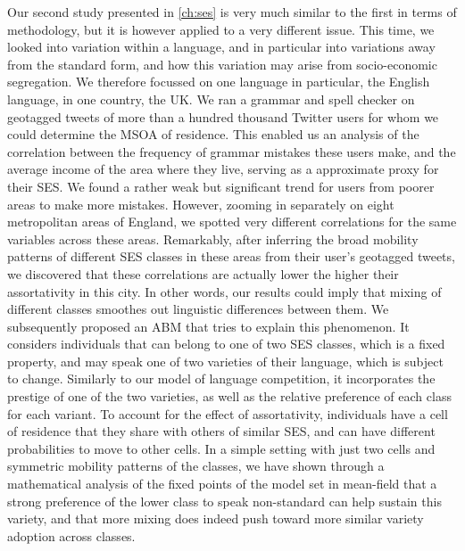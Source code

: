 \documentclass[../thesis.tex]{subfiles}
\begin{document}
Our second study presented in \cref{ch:ses} is very much similar to the first in terms
of methodology, but it is however applied to a very different issue. This time, we
looked into variation within a language, and in particular into variations away from the
standard form, and how this variation may arise from socio-economic segregation. We
therefore focussed on one language in particular, the English language, in one country,
the UK. We ran a grammar and spell checker on geotagged tweets of more than a hundred
thousand Twitter users for whom we could determine the \ac{MSOA} of residence. This
enabled us an analysis of the correlation between the frequency of grammar mistakes
these users make, and the average income of the area where they live, serving as a
approximate proxy for their \ac{SES}. We found a rather weak but significant trend for
users from poorer areas to make more mistakes. However, zooming in separately on eight
metropolitan areas of England, we spotted very different correlations for the same
variables across these areas. Remarkably, after inferring the broad mobility patterns of
different \ac{SES} classes in these areas from their user's geotagged tweets, we
discovered that these correlations are actually lower the higher their assortativity in
this city. In other words, our results could imply that mixing of different classes
smoothes out linguistic differences between them. We subsequently proposed an \ac{ABM}
that tries to explain this phenomenon. It considers individuals that can belong to one
of two \ac{SES} classes, which is a fixed property, and may speak one of two varieties
of their language, which is subject to change. Similarly to our model of language
competition, it incorporates the prestige of one of the two varieties, as well as the
relative preference of each class for each variant. To account for the effect of
assortativity, individuals have a cell of residence that they share with others of
similar \ac{SES}, and can have different probabilities to move to other cells. In a
simple setting with just two cells and symmetric mobility patterns of the classes, we
have shown through a mathematical analysis of the fixed points of the model set in
mean-field that a strong preference of the lower class to speak non-standard can help
sustain this variety, and that more mixing does indeed push toward more similar
variety adoption across classes.
\end{document}
